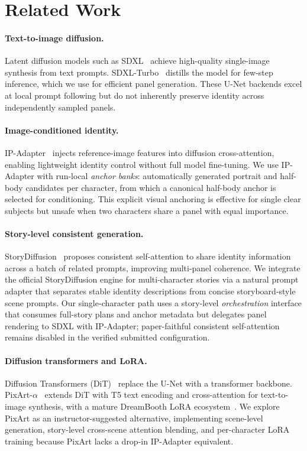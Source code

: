 \section{Related Work}
\label{sec:related}

\paragraph{Text-to-image diffusion.}
Latent diffusion models such as SDXL~\cite{podell2023sdxl} achieve high-quality single-image synthesis from text prompts.
SDXL-Turbo~\cite{sauer2023turbo} distills the model for few-step inference, which we use for efficient panel generation.
These U-Net backends excel at local prompt following but do not inherently preserve identity across independently sampled panels.

\paragraph{Image-conditioned identity.}
IP-Adapter~\cite{ye2023ip-adapter} injects reference-image features into diffusion cross-attention, enabling lightweight identity control without full model fine-tuning.
We use IP-Adapter with run-local \emph{anchor banks}: automatically generated portrait and half-body candidates per character, from which a canonical half-body anchor is selected for conditioning.
This explicit visual anchoring is effective for single clear subjects but unsafe when two characters share a panel with equal importance.

\paragraph{Story-level consistent generation.}
StoryDiffusion~\cite{zhou2024storydiffusion} proposes consistent self-attention to share identity information across a batch of related prompts, improving multi-panel coherence.
We integrate the official StoryDiffusion engine for multi-character stories via a natural prompt adapter that separates stable identity descriptions from concise storyboard-style scene prompts.
Our single-character path uses a story-level \emph{orchestration} interface that consumes full-story plans and anchor metadata but delegates panel rendering to SDXL with IP-Adapter; paper-faithful consistent self-attention remains disabled in the verified submitted configuration.

\paragraph{Diffusion transformers and LoRA.}
Diffusion Transformers (DiT)~\cite{peebles2023dit} replace the U-Net with a transformer backbone.
PixArt-$\alpha$~\cite{chen2023pixartalpha} extends DiT with T5 text encoding and cross-attention for text-to-image synthesis, with a mature DreamBooth LoRA ecosystem~\cite{ruiz2022dreambooth}.
We explore PixArt as an instructor-suggested alternative, implementing scene-level generation, story-level cross-scene attention blending, and per-character LoRA training because PixArt lacks a drop-in IP-Adapter equivalent.

